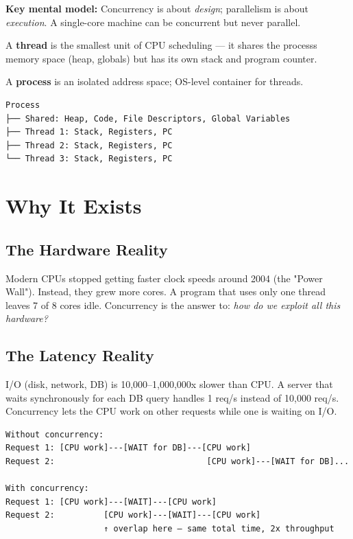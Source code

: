 \documentclass[11pt]{article}
\begin{document}
\textbf{Key mental model:} Concurrency is about \emph{design}; parallelism is about \emph{execution}. A single-core machine can be concurrent but never parallel.

A \textbf{thread} is the smallest unit of CPU scheduling --- it shares the process\textquotesingle s memory space (heap, globals) but has its own stack and program counter.

A \textbf{process} is an isolated address space; OS-level container for threads.

\setcodelang{}

\begin{verbatim}
Process
├── Shared: Heap, Code, File Descriptors, Global Variables
├── Thread 1: Stack, Registers, PC
├── Thread 2: Stack, Registers, PC
└── Thread 3: Stack, Registers, PC
\end{verbatim}

\section{Why It Exists}\label{why-it-exists}

\subsection{The Hardware Reality}\label{the-hardware-reality}

Modern CPUs stopped getting faster clock speeds around 2004 (the "Power Wall"). Instead, they grew more cores. A program that uses only one thread leaves 7 of 8 cores idle. Concurrency is the answer to: \emph{how do we exploit all this hardware?}

\subsection{The Latency Reality}\label{the-latency-reality}

I/O (disk, network, DB) is 10,000--1,000,000x slower than CPU. A server that waits synchronously for each DB query handles 1 req/s instead of 10,000 req/s. Concurrency lets the CPU work on other requests while one is waiting on I/O.

\setcodelang{}

\begin{verbatim}
Without concurrency:
Request 1: [CPU work]---[WAIT for DB]---[CPU work]
Request 2:                               [CPU work]---[WAIT for DB]...

With concurrency:
Request 1: [CPU work]---[WAIT]---[CPU work]
Request 2:          [CPU work]---[WAIT]---[CPU work]
                    ↑ overlap here — same total time, 2x throughput
\end{verbatim}
\end{document}
